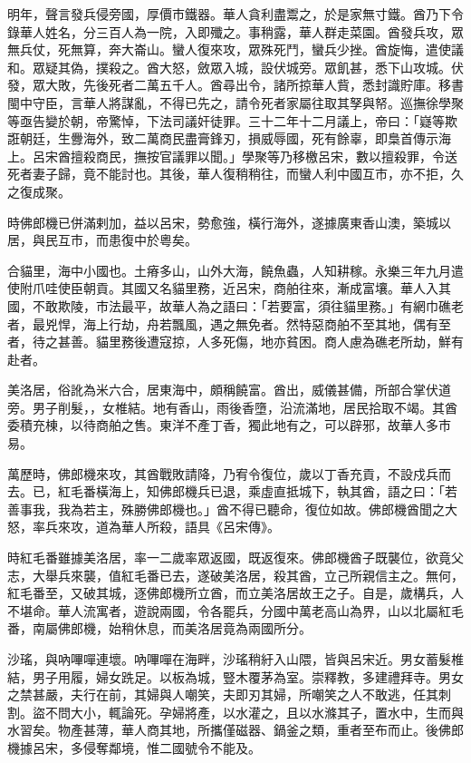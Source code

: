 \begin{pinyinscope}
明年，聲言發兵侵旁國，厚價市鐵器。華人貪利盡鬻之，於是家無寸鐵。酋乃下令錄華人姓名，分三百人為一院，入即殲之。事稍露，華人群走菜園。酋發兵攻，眾無兵仗，死無算，奔大崙山。蠻人復來攻，眾殊死鬥，蠻兵少挫。酋旋悔，遣使議和。眾疑其偽，撲殺之。酋大怒，斂眾入城，設伏城旁。眾飢甚，悉下山攻城。伏發，眾大敗，先後死者二萬五千人。酋尋出令，諸所掠華人貲，悉封識貯庫。移書閩中守臣，言華人將謀亂，不得已先之，請令死者家屬往取其孥與帑。巡撫徐學聚等亟告變於朝，帝驚悼，下法司議奸徒罪。三十二年十二月議上，帝曰：「嶷等欺誑朝廷，生釁海外，致二萬商民盡膏鋒刃，損威辱國，死有餘辜，即梟首傳示海上。呂宋酋擅殺商民，撫按官議罪以聞。」學聚等乃移檄呂宋，數以擅殺罪，令送死者妻子歸，竟不能討也。其後，華人復稍稍往，而蠻人利中國互市，亦不拒，久之復成聚。

時佛郎機已併滿剌加，益以呂宋，勢愈強，橫行海外，遂據廣東香山澳，築城以居，與民互市，而患復中於粵矣。

合貓里，海中小國也。土瘠多山，山外大海，饒魚蟲，人知耕稼。永樂三年九月遣使附爪哇使臣朝貢。其國又名貓里務，近呂宋，商舶往來，漸成富壤。華人入其國，不敢欺陵，市法最平，故華人為之語曰：「若要富，須往貓里務。」有網巾礁老者，最兇悍，海上行劫，舟若飄風，遇之無免者。然特惡商舶不至其地，偶有至者，待之甚善。貓里務後遭寇掠，人多死傷，地亦貧困。商人慮為礁老所劫，鮮有赴者。

美洛居，俗訛為米六合，居東海中，頗稱饒富。酋出，威儀甚備，所部合掌伏道旁。男子削髮，，女椎結。地有香山，雨後香墮，沿流滿地，居民拾取不竭。其酋委積充棟，以待商舶之售。東洋不產丁香，獨此地有之，可以辟邪，故華人多市易。

萬歷時，佛郎機來攻，其酋戰敗請降，乃宥令復位，歲以丁香充貢，不設戍兵而去。已，紅毛番橫海上，知佛郎機兵已退，乘虛直抵城下，執其酋，語之曰：「若善事我，我為若主，殊勝佛郎機也。」酋不得已聽命，復位如故。佛郎機酋聞之大怒，率兵來攻，道為華人所殺，語具《呂宋傳》。

時紅毛番雖據美洛居，率一二歲率眾返國，既返復來。佛郎機酋子既襲位，欲竟父志，大舉兵來襲，值紅毛番已去，遂破美洛居，殺其酋，立己所親信主之。無何，紅毛番至，又破其城，逐佛郎機所立酋，而立美洛居故王之子。自是，歲構兵，人不堪命。華人流寓者，遊說兩國，令各罷兵，分國中萬老高山為界，山以北屬紅毛番，南屬佛郎機，始稍休息，而美洛居竟為兩國所分。

沙瑤，與吶嗶嘽連壞。吶嗶嘽在海畔，沙瑤稍紆入山隈，皆與呂宋近。男女蓄髮椎結，男子用履，婦女跣足。以板為城，豎木覆茅為室。崇釋教，多建禮拜寺。男女之禁甚嚴，夫行在前，其婦與人嘲笑，夫即刃其婦，所嘲笑之人不敢逃，任其刺割。盜不問大小，輒論死。孕婦將產，以水灌之，且以水滌其子，置水中，生而與水習矣。物產甚薄，華人商其地，所攜僅磁器、鍋釜之類，重者至布而止。後佛郎機據呂宋，多侵奪鄰境，惟二國號令不能及。


\end{pinyinscope}
